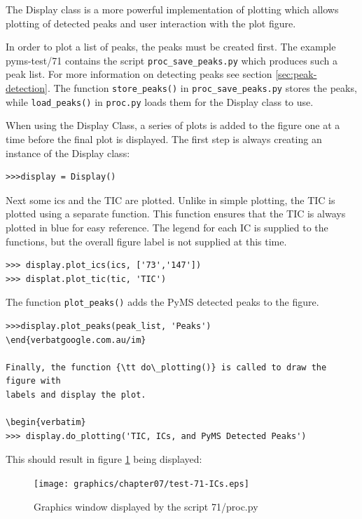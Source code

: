 The Display class is a more powerful implementation of plotting which 
allows plotting of detected peaks and user interaction with the plot
figure.

In order to plot a list of peaks, the peaks must be created first.
The example pyms-test/71 contains the script {\tt proc\_save\_peaks.py}
which produces such a peak list. For more information on detecting peaks
see section \ref{sec:peak-detection}. The function {\tt store\_peaks()}
in {\tt proc\_save\_peaks.py} stores the peaks, while {\tt load\_peaks()}
in {\tt proc.py} loads them for the Display class to use.

When using the Display Class, a series of plots is added to the figure
one at a time before the final plot is displayed. The first step is
always creating an instance of the Display class:

\begin{verbatim}
>>>display = Display()
\end{verbatim}

Next some ics and the TIC are plotted. Unlike in simple plotting, the
TIC is plotted using a separate function. This function ensures that
the TIC is always plotted in blue for easy reference. The legend for
each IC is supplied to the functions, but the overall figure label
is not supplied at this time.

\begin{verbatim}
>>> display.plot_ics(ics, ['73','147'])
>>> displat.plot_tic(tic, 'TIC')
\end{verbatim}

The function {\tt plot\_peaks()} adds the PyMS detected peaks to the
figure.

\begin{verbatim}
>>>display.plot_peaks(peak_list, 'Peaks')
\end{verbatgoogle.com.au/im}

Finally, the function {\tt do\_plotting()} is called to draw the figure with 
labels and display the plot.

\begin{verbatim}
>>> display.do_plotting('TIC, ICs, and PyMS Detected Peaks')
\end{verbatim}

This should result in figure \ref{fig:71-ics} being displayed:

\begin{figure}
  \begin{center}
    \texttt{[image: graphics/chapter07/test-71-ICs.eps]}
  \end{center}
  \caption{Graphics window displayed by the script 71/proc.py}
  \label{fig:71-ics}
\end{figure}

